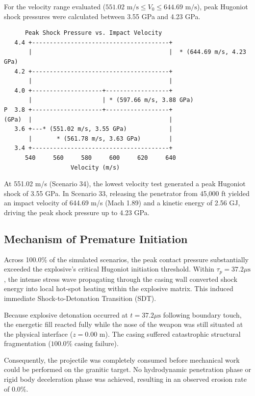\documentclass[11pt,a4paper]{article}
\begin{document}
For the velocity range evaluated ($551.02\text{ m/s} \le V_0 \le 644.69\text{ m/s}$), peak Hugoniot shock pressures were calculated between 3.55 GPa and 4.23 GPa.

\begin{verbatim}
      Peak Shock Pressure vs. Impact Velocity
   4.4 +---------------------------------------+
       |                                       |  * (644.69 m/s, 4.23 GPa)
   4.2 +---------------------------------------+ 
       |                                       |
   4.0 +--------------------+------------------+
       |                    | * (597.66 m/s, 3.88 GPa)
P  3.8 +--------------------+------------------+
(GPa)  |                                       |
   3.6 +---* (551.02 m/s, 3.55 GPa)            |
       |       * (561.78 m/s, 3.63 GPa)        |
   3.4 +---------------------------------------+
      540     560     580     600     620     640
                   Velocity (m/s)
\end{verbatim}

At 551.02 m/s (Scenario 34), the lowest velocity test generated a peak Hugoniot shock of 3.55 GPa. In Scenario 33, releasing the penetrator from 45,000 ft yielded an impact velocity of 644.69 m/s (Mach 1.89) and a kinetic energy of 2.56 GJ, driving the peak shock pressure up to 4.23 GPa.

\subsection{Mechanism of Premature Initiation}
Across 100.0\% of the simulated scenarios, the peak contact pressure substantially exceeded the explosive's critical Hugoniot initiation threshold. Within $\tau_p = 37.2\mu\text{s}$, the intense stress wave propagating through the casing wall converted shock energy into local hot-spot heating within the explosive matrix. This induced immediate Shock-to-Detonation Transition (SDT).

Because explosive detonation occurred at $t = 37.2\mu\text{s}$ following boundary touch, the energetic fill reacted fully while the nose of the weapon was still situated at the physical interface ($z = 0.00\text{ m}$). The casing suffered catastrophic structural fragmentation ($100.0\%\text{ casing failure}$). 

Consequently, the projectile was completely consumed before mechanical work could be performed on the granitic target. No hydrodynamic penetration phase or rigid body deceleration phase was achieved, resulting in an observed erosion rate of $0.0\%$.
\end{document}
